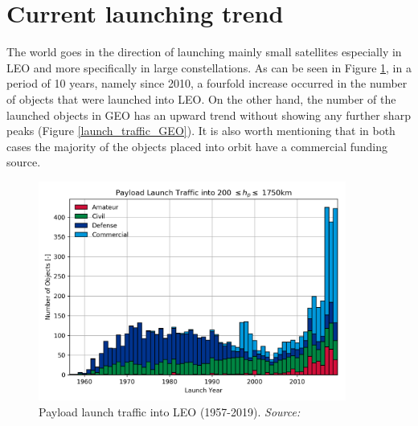 


\bigskip
\section{Current launching trend}
\bigskip


The world goes in the direction of launching mainly small satellites especially in LEO and more specifically in large constellations. As can be seen in Figure \ref{launch_traffic_LEO}, in a period of 10 years, namely since 2010, a fourfold increase occurred in the number of objects that were launched into LEO. On the other hand, the number of the launched objects in GEO has an upward trend without showing any further sharp peaks (Figure \ref{launch_traffic_GEO}). It is also worth mentioning that in both cases the majority of the objects placed into orbit have a commercial funding source.

\begin{figure}
\centering
\includegraphics[width=0.9\textwidth]{Images/launch_traffic_LEO.png}\caption{Payload launch traffic into LEO (1957-2019). \textit{Source: \cite{ESA 2019}}}
\label{launch_traffic_LEO} 
\end{figure}

